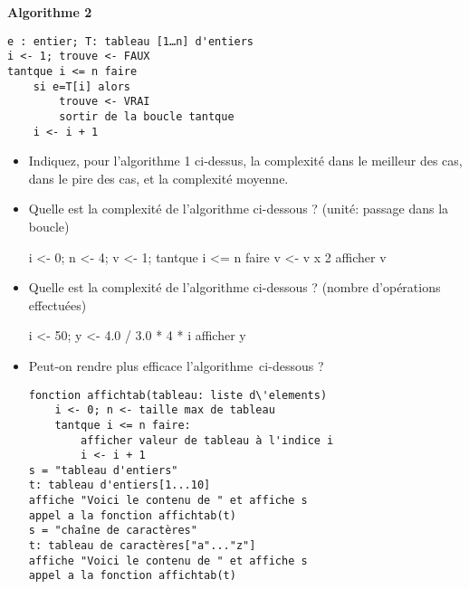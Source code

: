 \textbf{Algorithme 2}
\vspace{-0.3cm}

\begin{verbatim}
e : entier; T: tableau [1…n] d'entiers
i <- 1; trouve <- FAUX
tantque i <= n faire
    si e=T[i] alors
        trouve <- VRAI
        sortir de la boucle tantque
    i <- i + 1
\end{verbatim}
\vspace{-0.5cm}
\begin{itemize}
  \item  Indiquez, pour l'algorithme 1 ci-dessus, la complexité dans le meilleur des cas, dans le pire des cas, et la complexité moyenne.
  \item  Quelle est la complexité de l'algorithme ci-dessous ? (unité: passage dans la boucle)

\begin{python}
i <- 0; n <- 4; v <- 1;
tantque i <= n faire
    v <- v x 2
    afficher v
\end{python}
  \item  Quelle est la complexité de l'algorithme ci-dessous ? (nombre d'opérations effectuées)
\begin{python}
i <- 50;
y <- 4.0 / 3.0 * 4 * i
afficher y
\end{python}

  \item  Peut-on rendre plus efficace l'algorithme ci-dessous ?
\begin{verbatim}
fonction affichtab(tableau: liste d\'elements)
    i <- 0; n <- taille max de tableau
    tantque i <= n faire:
        afficher valeur de tableau à l'indice i
        i <- i + 1
s = "tableau d'entiers"
t: tableau d'entiers[1...10]
affiche "Voici le contenu de " et affiche s
appel a la fonction affichtab(t)
s = "chaîne de caractères"
t: tableau de caractères["a"..."z"]
affiche "Voici le contenu de " et affiche s
appel a la fonction affichtab(t)
\end{verbatim}
\end{itemize}

